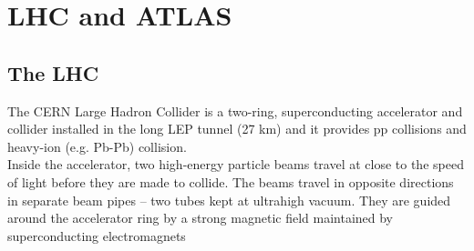\documentclass[a4paper, oneside]{book}
\begin{document}
\tableofcontents

	\chapter{LHC and ATLAS}
		\section{The LHC}
		The CERN Large Hadron Collider is a two-ring, superconducting accelerator and collider installed in the long LEP tunnel (27 km)\cite{LHC design} and it provides pp collisions and heavy-ion (e.g. Pb-Pb) collision.\\
		Inside the accelerator, two high-energy particle beams travel at close to the speed of light before they are made to collide. The beams travel in opposite directions in separate beam pipes – two tubes kept at ultrahigh vacuum. They are guided around the accelerator ring by a strong magnetic field maintained by superconducting electromagnets\cite{LHC introduction}
\end{document}
